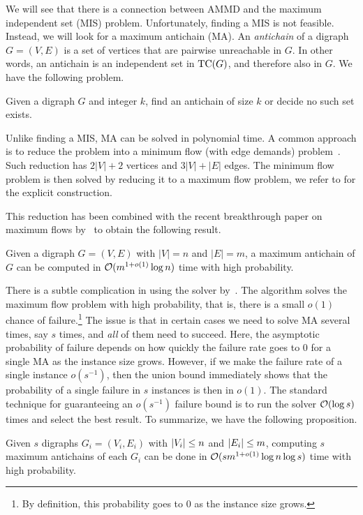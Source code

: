 \label{sec:maxanti}
We will see that there is a connection between AMMD and the maximum independent set (MIS) problem.
Unfortunately, finding a MIS is not feasible. Instead, we will look for a maximum antichain (MA).
An \emph{antichain} of a digraph $G=(V, E)$ is a set of vertices that are pairwise unreachable in $G$. In other words, an antichain is an independent set in $\text{TC}(G)$,
and therefore also in $G$.
We have the following problem.
\begin{prob}[MA]\label{prob:maxa}
Given a digraph $G$ and integer $k$, find an antichain of size $k$ or decide no such set exists.
\end{prob}

Unlike finding a MIS, MA can be solved in polynomial time.
A common approach is to reduce the problem into a minimum flow (with edge demands) problem~\cite{ntafos1979path,marchal2018parallel,
caceres2023minimum,pijls2013another}. Such reduction has $2|V|+ 2$ vertices and $3|V|+|E|$ edges. The minimum flow problem is then solved by reducing it to a maximum flow problem, we refer to \cite{caceres2023minimum} for the explicit construction.

This reduction has been combined with the recent breakthrough paper on maximum flows by~\citet{chen2022maximum}
to obtain the following result.
\begin{prop}
Given a digraph $G=(V,E)$ with $|V|=n$ and $|E|=m$, a maximum antichain of $G$ can be computed in $\mathcal{O}(m^{1 + o(1)} \log n)$ time with high probability.
\end{prop}

There is a subtle complication in using the solver by~\citet{chen2022maximum}.
The algorithm solves the maximum flow problem with high probability, that is, there is a small $o(1)$ chance of failure.\!\footnote{By definition, this probability goes to 0 as the instance size grows.}
The issue is that in certain cases we need to solve MA several times, say $s$ times, and \emph{all} of them need to succeed. 
Here, the asymptotic probability of failure depends on how quickly the failure rate goes to 0 for a single MA as the instance size grows.
However, if we make the failure rate of a single instance $o(s^{-1})$, then the union bound immediately shows that the probability of a single failure
in $s$ instances is then in $o(1)$. The standard technique for guaranteeing an $o(s^{-1})$ failure bound is to run the solver $\mathcal{O}(\log s)$ times
and select the best result.
To summarize, we have the following proposition.
\begin{prop}\label{prop:multima}
Given $s$ digraphs $G_i = (V_i,E_i)$ with ${\left|V_i\right|} \leq n$ and ${\left|E_i\right|} \leq m$, computing $s$ maximum antichains of each $G_i$ can be done in $\mathcal{O}(s m^{1 + o(1)} \log n \log s)$ time with high probability.
\end{prop}

